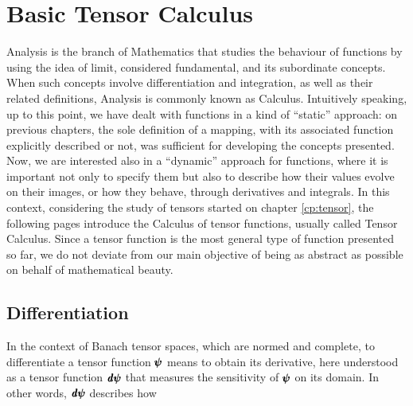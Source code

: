 
\chapter{Basic Tensor Calculus}

Analysis is the branch of Mathematics that studies the behaviour of functions by using the idea of limit, considered fundamental, and its subordinate concepts. When such concepts involve  differentiation and integration, as well as their related definitions, Analysis is commonly known as Calculus. Intuitively speaking, up to this point, we have dealt with functions in a kind of ``static'' approach: on previous chapters, the sole definition of a mapping, with its associated function explicitly described or not, was sufficient for developing the concepts presented. Now, we are interested also in a ``dynamic'' approach for functions, where it is important not only to specify them but also to describe how their values evolve on their images, or how they behave, through derivatives and integrals. In this context, considering the study of tensors started on chapter \ref{cp:tensor}, the following pages introduce the Calculus of tensor functions, usually called Tensor Calculus. Since a tensor function is the most general type of function presented so far, we do not deviate from our main objective of being as abstract as possible on behalf of mathematical beauty.  



\section{Differentiation}

In the context of Banach tensor spaces, which are normed and complete, to differentiate a tensor function $\pmb{\psi}$ means to obtain its derivative, here understood as a tensor function $\pmb{\mathit{d}\psi}$ that measures the sensitivity of $\pmb{\psi}$ on its domain. In other words, $\pmb{\mathit{d}\psi}$ describes how